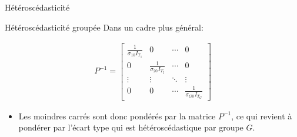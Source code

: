 \documentclass{beamer}
\begin{document}
\begin{frame}{Hétéroscédasticité}
\begin{block}{Hétéroscédasticité groupée}
Dans un cadre plus général:

\begin{align*}
P^{-1}= \begin{bmatrix} \frac{1}{\sigma_{10}I_{T_1}} & 0 & \cdots & 0 \\
0 & \frac{1}{\sigma_{20}I_{T_2}} & \cdots & 0 \\
\vdots & \vdots & \ddots & \vdots \\
0 & 0 & \cdots & \frac{1}{\sigma_{G0}I_{T_G}}
\end{bmatrix}
\end{align*}
\begin{itemize}
\item Les moindres carrés sont donc pondérés par la matrice $P^{-1}$, ce qui revient à pondérer par l’écart type qui est hétéroscédastique par groupe $G$.
\end{itemize}
\end{block}
\end{frame}
\end{document}
